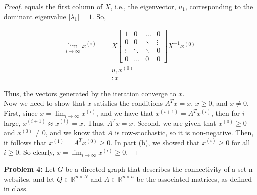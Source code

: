 \documentclass[12pt]{article}
\def\R{\mathbb{R}}
\begin{document}
\begin{itemize}
\begin{proof}
equals the first column of $X$, i.e., the eigenvector, $u_1$, corresponding to the dominant eigenvalue $|\lambda_1| = 1$.  So,

\begin{align}
\lim_{i \rightarrow \infty} x^{(i)} &= X \begin{bmatrix}
	1 & 0 & \hdots & 0 \\
	0 & 0 & \ddots & \vdots \\
	\vdots & \ddots & \ddots & 0 \\
	0 & \hdots & 0 & 0
	\end{bmatrix} X^{-1} x^{(0)} \nonumber \\
&= u_1 x^{(0)} \nonumber \\
&=: x \nonumber
\end{align}

Thus, the vectors generated by the iteration converge to $x$.\\

Now we need to show that $x$ satisfies the conditions $A^T x = x$, $x \geq 0$, and $x \neq 0$.  First, since $x = \lim_{i \rightarrow \infty} x^{(i)}$, and we have that $x^{(i+1)} = A^Tx^{(i)}$, then for $i$ large, $x^{(i+1)} \approx x^{(i)} = x$.  Thus, $A^T x = x$.  Second, we are given that $x^{(0)} \geq 0$ and $x^{(0)} \neq 0$, and we know that $A$ is row-stochastic, so it is non-negative.  Then, it follows that $x^{(1)} = A^Tx^{(0)} \geq 0$.  In part (b), we showed that $x^{(i)} \geq 0$ for all $i \geq 0$.  So clearly, $x = \lim_{i \rightarrow \infty} x^{(i)} \geq 0$.
\end{proof}
\end{itemize}

\bigskip\bigskip
\noindent
\textbf{Problem 4:} Let $G$ be a directed graph that describes the connectivity of a set n websites, and let $Q \in \R^{n\times N}$ and $A \in \R^{n\times n}$ be the associated matrices, as defined in class.
\end{document}
